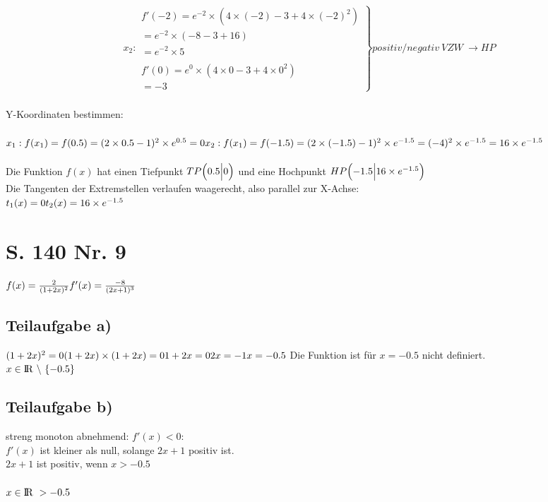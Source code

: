\documentclass[11pt, a4paper]{report}
\begin{document}
	\begin{align}
		\left.x_2:
		\begin{array}{ll}
			f'(-2) = e^{-2} \times (4\times (-2) - 3 + 4\times (-2)^2)\\
			 = e^{-2} \times (-8 - 3 + 16)\\
			 = e^{-2} \times 5\\
			 \\
			 f'(0) = e^{0} \times (4\times 0 - 3 + 4\times 0^2)\\
			 = - 3
		\end{array}
		\right\} positiv/negativ\ VZW\ \to HP
	\end{align}
	\\
	Y-Koordinaten bestimmen: \\\\
	$
	x_1: f(x_1) = f(0.5) = (2 \times 0.5 - 1)^2 \times e^{0.5} = 0 \\
	x_2: f(x_1) = f(-1.5) = (2 \times (-1.5) - 1)^2 \times e^{-1.5} = (-4)^2 \times e^{-1.5} = 16 \times e^{-1.5}
	$
	\\\\
	Die Funktion $f(x)$ hat einen Tiefpunkt $TP\Bigl(0.5\Bigl|0\Bigl)$ und eine Hochpunkt $HP\Bigl(-1.5\Bigl|16 \times e^{-1.5}\Bigl)$ \\
	Die Tangenten der Extremstellen verlaufen waagerecht, also parallel zur X-Achse: \\
	$
	t_1(x) = 0 \\
	t_2(x) = 16 \times e^{-1.5}
	$
	
	\chapter{S. 140 Nr. 9}
	$
	f(x) = \frac{2}{(1+2x)^2} \\
	f'(x) = \frac{-8}{(2x+1)^3}
	$
	\section{Teilaufgabe a)}
	$
	(1 + 2x)^2 = 0 \\
	(1 + 2x) \times (1 + 2x) = 0 \\
	1 + 2x = 0 \\
	2x = -1 \\
	x = -0.5 \\
	$
	Die Funktion ist für $x = -0.5$ nicht definiert. \\
	$
	x \in \rm I\!R\ \backslash\ \{-0.5\}
	$
	\section{Teilaufgabe b)}
	streng monoton abnehmend: $f'(x) < 0$: \\
	$f'(x)$ ist kleiner als null, solange $2x +1$ positiv ist. \\
	$2x + 1$ ist positiv, wenn $x > -0.5$ \\\\
	$
	x \in \rm I\!R\ > -0.5
	$
\end{document}
